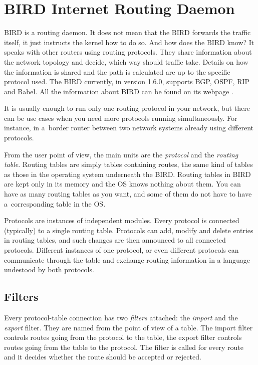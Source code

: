 \chapter{BIRD Internet Routing Daemon}

BIRD is a routing daemon. It does not mean that the BIRD forwards the traffic
itself, it just instructs the kernel how to do so. And how does the BIRD know?
It speaks with other routers using routing protocols. They share information
about the network topology and decide, which way should traffic take. Details
on how the information is shared and the path is calculated are up to the
specific protocol used. The BIRD currently, in version 1.6.0, supports BGP,
OSPF, RIP and Babel. All the information about BIRD can be found on its webpage
\cite{birdweb}.

It is usually enough to run only one routing protocol in your network, but there
can be use cases when you need more protocols running simultaneously. For instance, in a~border
router between two network systems already using different protocols.

From the user point of view, the main units are the \emph{protocol} and the
\emph{routing table}. Routing tables are simply tables containing routes, the
same kind of tables as those in the operating system underneath the BIRD.
Routing tables in BIRD are kept only in its memory and the OS knows nothing
about them. You can have as many routing tables as you want, and some of them do
not have to have a~corresponding table in the OS.

Protocols are instances of independent modules. Every protocol is connected
(typically) to a single routing table. Protocols can add, modify and delete entries
in routing tables, and such changes are then announced to all connected
protocols. Different instances of one protocol, or even different protocols can
communicate through the table and exchange routing information in a language
undestood by both protocols.

\section{Filters}
Every protocol-table connection has two \emph{filters} attached: the
\emph{import} and the \emph{export} filter. They are named from the point of
view of a table. The import filter controls routes going from the protocol to
the table, the export filter controls routes going from the table to the
protocol. The filter is called for every route and it decides whether the route
should be accepted or rejected.


